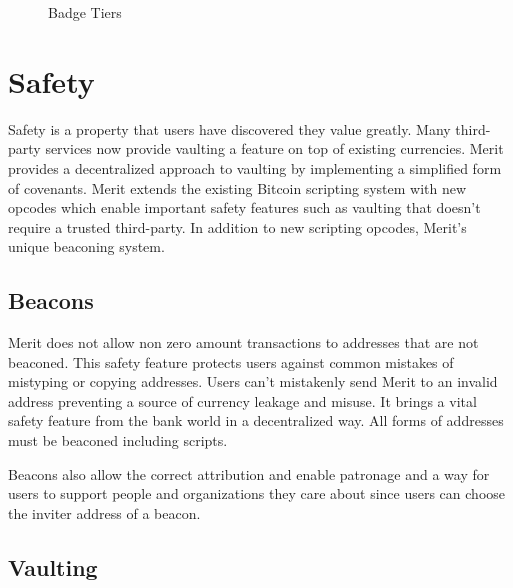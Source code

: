 \documentclass{article}
\begin{document}
\begin{figure}[H]
    \begin{center}
    \end{center}
    \caption{Badge Tiers}
\end{figure}


\section{Safety}

Safety is a property that users have discovered they value greatly.  Many third-party
services now provide vaulting a feature on top of existing currencies.  Merit
provides a decentralized approach to vaulting by implementing a simplified form
of covenants.  Merit extends the existing Bitcoin scripting system with new
opcodes which enable important safety features such as vaulting that doesn't
require a trusted third-party.  In addition to new scripting opcodes, Merit's
unique beaconing system.

\subsection{Beacons}

Merit does not allow non zero amount transactions to addresses that are not beaconed.
This safety feature protects users against common mistakes of mistyping or copying
addresses.  Users can't mistakenly send Merit to an invalid address preventing
a source of currency leakage and misuse.  It brings a vital safety feature
from the bank world in a decentralized way.  All forms of addresses must be
beaconed including scripts.

Beacons also allow the correct attribution and enable patronage and a way for users
to support people and organizations they care about since users can choose the
inviter address of a beacon. 

\subsection{Vaulting}
\end{document}
